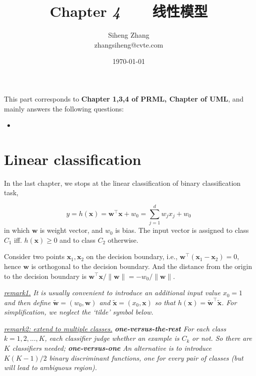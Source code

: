 \documentclass{article}
\author{Siheng Zhang\\zhangsiheng@cvte.com}
\title{Chapter \textbf{\textit{4}}\ \ \ \ 线性模型}
\date{\today}
\begin{document}
\maketitle  

This part corresponds to \textbf{Chapter 1,3,4 of PRML, Chapter of UML}, and mainly answers the following questions:

\begin{itemize}
\item 
\end{itemize}

\tableofcontents
\newpage

\section{Linear classification}

	In the last chapter, we stops at the linear classification of binary classification task,
	
	\begin{equation}
	y=h(\mathbf{x})=\mathbf{w}^\top \mathbf{x} + w_0 = \sum_{j=1}^d w_j x_j + w_0
	\label{eq:linear}
	\end{equation}
in which $\mathbf{w}$ is weight vector, and $w_0$ is bias. The input vector is assigned to class $C_1$ iff. $h(\mathbf{x})\geq 0$ and to class $C_2$ otherwise.

	Consider two points $\mathbf{x}_1,\mathbf{x}_2$ on the decision boundary, i.e., $\mathbf{w}^\top (\mathbf{x}_1 - \mathbf{x}_2) = 0$, hence $\mathbf{w}$ is orthogonal to the decision boundary. And the distance from the origin to the decision boundary is $\mathbf{w}^\top \mathbf{x} / \|\mathbf{w}\|=-w_0/\|\mathbf{w}\|$.
	
	\vspace{2mm}
	\begin{scriptsize}
	\begin{spacing}{1.2}
	{\sffamily
	\noindent\textit{\underline{remark1.} It is usually convenient to  introduce an additional input value $x_0 = 1$ and then define $\tilde{\mathbf{w}} = (w_0, \mathbf{w})$ and $\tilde{\mathbf{x}} = (x_0, \mathbf{x})$ so that $h(\mathbf{x}) = \tilde{\mathbf{w}}^\top \tilde{\mathbf{x}}$. For simplification, we neglect the `tilde' symbol below.}
	
	\noindent\textit{\underline{remark2: extend to multiple classes.}  \textbf{one-versus-the-rest} For each class $k=1,2,...,K$, each classifier judge whether an example is $C_k$ or not. So there are $K$ classifiers needed;  \textbf{one-versus-one} An alternative is to introduce $K(K-1)/2$ binary discriminant functions, one for every pair of classes (but will lead to ambiguous region).}}
	\end{spacing}
	\end{scriptsize}
	\vspace{-2mm}
	
\end{document}
